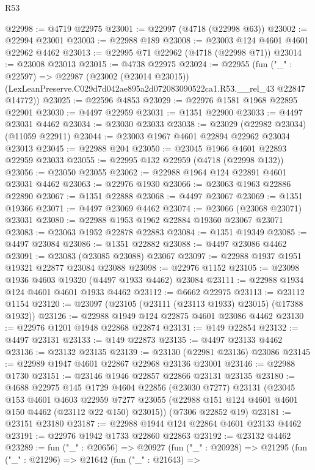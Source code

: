 \begin{lexlean}{R53}
\begin{coremodule}
@22998 := @4719 @22975
@23001 := @22997 (@4718 (@22998 @63))
@23002 := @22994 @23001
@23003 := @22988 @189
@23008 := @23003 @124 @4601 @4601 @22962 @4462
@23013 := @22995 @71 @22962 (@4718 (@22998 @71))
@23014 := @23008 @23013
@23015 := @4738 @22975
@23024 := @22955
    (fun ("_" : @22597) =>
    @22987
      (@23002 (@23014 @23015))
      (LexLeanPreserve.C029d7d042ae895a2d072083090522ca1.R53.__rel_43 @22847 @14772))
@23025 := @22596 @4853
@23029 := @22976 @1581 @1968 @22895 @22901
@23030 := @4497 @22959
@23031 := @1351 @22900
@23033 := @4497 @23031 @4462
@23034 := @23030 @23033
@23038 := @23029 (@22982 @23034) (@11059 @22911)
@23044 := @23003 @1967 @4601 @22894 @22962 @23034 @23013
@23045 := @22988 @204
@23050 := @23045 @1966 @4601 @22893 @22959 @23033
@23055 := @22995 @132 @22959 (@4718 (@22998 @132))
@23056 := @23050 @23055
@23062 := @22988 @1964 @124 @22891 @4601 @23031 @4462
@23063 := @22976 @1930
@23066 := @23063 @1963 @22886 @22890
@23067 := @1351 @22888
@23068 := @4497 @23067
@23069 := @1351 @19366
@23071 := @4497 @23069 @4462
@23074 := @23066 (@23068 @23071) @23031
@23080 := @22988 @1953 @1962 @22884 @19360 @23067 @23071
@23083 := @23063 @1952 @22878 @22883
@23084 := @1351 @19349
@23085 := @4497 @23084
@23086 := @1351 @22882
@23088 := @4497 @23086 @4462
@23091 := @23083 (@23085 @23088) @23067
@23097 := @22988 @1937 @1951 @19321 @22877 @23084 @23088
@23098 := @22976 @1152
@23105 := @23098 @1936 @4603 @19320 (@4497 @1933 @4462) @23084
@23111 := @22988 @1934 @124 @4601 @4601 @1933 @4462
@23112 := @6662 @22975
@23113 := @23112 @1154
@23120 := @23097 (@23105 (@23111 (@23113 @1933) @23015) (@17388 @1932))
@23126 := @22988 @1949 @124 @22875 @4601 @23086 @4462
@23130 := @22976 @1201 @1948 @22868 @22874
@23131 := @149 @22854
@23132 := @4497 @23131
@23133 := @149 @22873
@23135 := @4497 @23133 @4462
@23136 := @23132 @23135
@23139 := @23130 (@22981 @23136) @23086
@23145 := @22989 @1947 @4601 @22867 @22968 @23136 @23001
@23146 := @22988 @1730
@23151 := @23146 @1946 @22857 @22866 @23131 @23135
@23180 := @4688
    @22975
    @145
    @1729
    @4604
    @22856
    (@23030 @7277)
    @23131
    (@23045
      @153
      @4601
      @4603
      @22959
      @7277
      @23055
      (@22988 @151 @124 @4601 @4601 @150 @4462 (@23112 @22 @150) @23015))
    (@7306 @22852 @19)
@23181 := @23151 @23180
@23187 := @22988 @1944 @124 @22864 @4601 @23133 @4462
@23191 := @22976 @1942 @1733 @22860 @22863
@23192 := @23132 @4462
@23289 := fun ("_" : @20656) =>
  @20927
    (fun ("_" : @20928) =>
    @21295
      (fun ("_" : @21296) =>
      @21642
        (fun ("_" : @21643) =>

\end{coremodule}
\end{lexlean}
